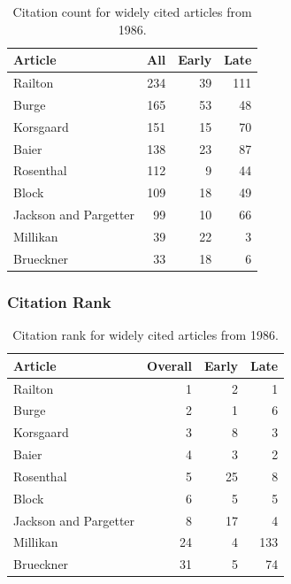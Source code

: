 \documentclass[
  10pt,
  letterpaper,
  DIV=11,
  numbers=noendperiod,
  twoside]{scrartcl}
\begin{document}
\begin{longtable}[]{@{}lrrr@{}}

\caption{\label{tbl-citation-count-1986}Citation count for widely cited
articles from 1986.}

\tabularnewline

\toprule\noalign{}
Article & All & Early & Late \\
\midrule\noalign{}
\endhead
\bottomrule\noalign{}
\endlastfoot
Railton & 234 & 39 & 111 \\
Burge & 165 & 53 & 48 \\
Korsgaard & 151 & 15 & 70 \\
Baier & 138 & 23 & 87 \\
Rosenthal & 112 & 9 & 44 \\
Block & 109 & 18 & 49 \\
Jackson and Pargetter & 99 & 10 & 66 \\
Millikan & 39 & 22 & 3 \\
Brueckner & 33 & 18 & 6 \\

\end{longtable}

\subsubsection*{Citation Rank}\label{sec-rank-1986}

\begin{longtable}[]{@{}lrrr@{}}

\caption{\label{tbl-citation-rank-1986}Citation rank for widely cited
articles from 1986.}

\tabularnewline

\toprule\noalign{}
Article & Overall & Early & Late \\
\midrule\noalign{}
\endhead
\bottomrule\noalign{}
\endlastfoot
Railton & 1 & 2 & 1 \\
Burge & 2 & 1 & 6 \\
Korsgaard & 3 & 8 & 3 \\
Baier & 4 & 3 & 2 \\
Rosenthal & 5 & 25 & 8 \\
Block & 6 & 5 & 5 \\
Jackson and Pargetter & 8 & 17 & 4 \\
Millikan & 24 & 4 & 133 \\
Brueckner & 31 & 5 & 74 \\

\end{longtable}
\end{document}

